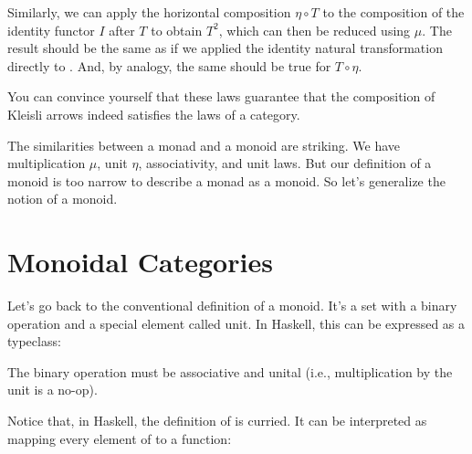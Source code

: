 \noindent
Similarly, we can apply the horizontal composition $\eta \circ T$ to the
composition of the identity functor $I$ after $T$ to
obtain $T^2$, which can then be reduced using $\mu$. The
result should be the same as if we applied the identity natural
transformation directly to . And, by analogy, the same should
be true for $T \circ \eta$.

\begin{figure}[H]
\centering
{}
\end{figure}

\noindent
You can convince yourself that these laws guarantee that the composition
of Kleisli arrows indeed satisfies the laws of a category.

The similarities between a monad and a monoid are striking. We have
multiplication $\mu$, unit $\eta$, associativity, and unit laws. But our
definition of a monoid is too narrow to describe a monad as a monoid. So
let's generalize the notion of a monoid.

\section{Monoidal Categories}

Let's go back to the conventional definition of a monoid. It's a set
with a binary operation and a special element called unit. In Haskell,
this can be expressed as a typeclass:

The binary operation  must be associative and unital
(i.e., multiplication by the unit  is a no-op).

Notice that, in Haskell, the definition of  is curried.
It can be interpreted as mapping every element of  to a
function:

